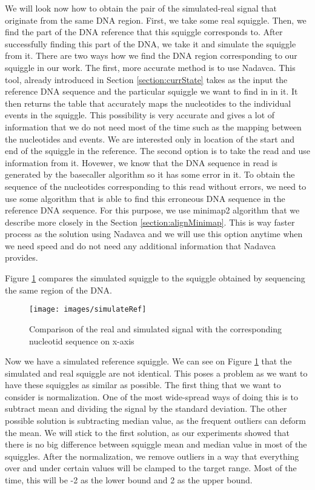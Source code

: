 We will look now how to obtain the pair of the simulated-real signal that originate
from the same DNA region. First, we take some real squiggle.
Then, we find the part of the DNA reference that this squiggle corresponds to. After
successfully finding this part of the DNA, we take it and simulate the squiggle from it. There are two
ways how we find the DNA region corresponding to our squiggle in our work. The first, more accurate method is to
use Nadavca. This tool, already introduced in Section \ref{section:currState} takes
as the input the reference DNA sequence and the particular squiggle we want to find in
in it. It then returns the table that accurately maps the nucleotides to the individual
events in the squiggle. This possibility is very accurate and gives a lot of information
that we do not need most of the time such as the mapping between the nucleotides
and events. We are interested only in location of the start and end of the squiggle
in the reference. The second option is to take the read and use information from it.
Hovewer, we know that the DNA sequence in read is generated by the basecaller algorithm so it has some error
in it. To obtain the sequence of the nucleotides corresponding to this read without
errors, we need to use some algorithm that is able to find this erroneous DNA
sequence in the reference DNA sequence. For this purpose, we use minimap2 algorithm
that we describe more closely in the Section \ref{section:alignMinimap}. This is way faster
process as the solution using Nadavca and we will use this option anytime when we need
speed and do not need any additional information that Nadavca provides.

Figure \ref{obr:simVsReal} compares the simulated squiggle to the squiggle obtained
by sequencing the same region of the DNA.

\begin{figure}
\centerline{\texttt{[image: images/simulateRef]}}
\caption[TODO]{Comparison of the real and simulated signal with the corresponding nucleotid sequence on x-axis}
\label{obr:simVsReal}
\end{figure}

Now we have a simulated reference squiggle. We can see on Figure \ref{obr:simVsReal} that the simulated and real
squiggle are not identical. This poses a problem as we want to have these squiggles as
similar as possible. The first thing that we want to consider is normalization.
One of the most wide-spread ways of doing this is to subtract mean and dividing
the signal by the standard deviation. The other possible solution is subtracting median value,
as the frequent outliers can deform the mean. We will stick to the first solution,
as our experiments showed that there is no big difference between squiggle mean
and median value in most of the squiggles.
After the normalization, we remove outliers in a way that everything over and under certain values will
be clamped to the target range. Most of the time, this will be -2 as the lower bound
and 2 as the upper bound.


